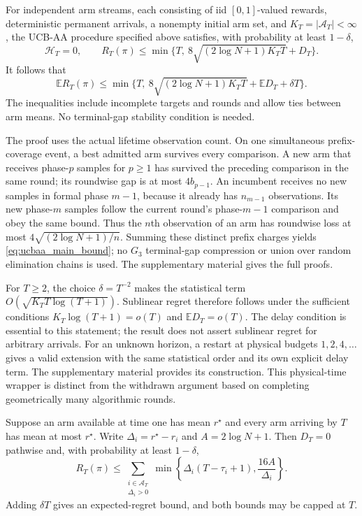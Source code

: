 \begin{theorem}
\label{thm:ucbaa_main_fixed_budget}
For independent arm streams, each consisting of iid $[0,1]$-valued rewards,
deterministic permanent arrivals, a nonempty initial arm set, and
$K_T=|\mathcal A_T|<\infty$,
the UCB-AA procedure specified
above satisfies, with probability at least $1-\delta$,
\[
 \mathcal H_T=0,\qquad
 R_T(\pi)\le\min\{T,\ 8\sqrt{(2\log N+1)K_TT}+D_T\}.
\]
It follows that
\begin{equation}
 \mathbb E R_T(\pi)\le
 \min\{T,\ 8\sqrt{(2\log N+1)K_TT}
                  +\mathbb E D_T+\delta T\}.
 \label{eq:ucbaa_main_bound}
\end{equation}
The inequalities include incomplete targets and rounds and allow ties
between arm means. No terminal-gap stability condition is needed.
\end{theorem}

The proof uses the actual lifetime observation count. On one simultaneous
prefix-coverage event, a best admitted arm survives every comparison.
A new arm that receives phase-$p$ samples for $p\ge1$ has survived the
preceding comparison in the same round; its roundwise gap is at most
$4b_{p-1}$. An incumbent receives no new samples in formal phase $m-1$,
because it already has $n_{m-1}$ observations. Its new phase-$m$ samples
follow the current round's phase-$m-1$ comparison and obey the same bound.
Thus the $n$th observation of an arm has roundwise loss at most
$4\sqrt{(2\log N+1)/n}$. Summing these distinct prefix charges yields
\eqref{eq:ucbaa_main_bound}; no $G_3$ terminal-gap compression or
union over random elimination chains is used. The supplementary material
gives the full proofs.

For $T\ge2$, the choice $\delta=T^{-2}$ makes the statistical term
$O(\sqrt{K_TT\log(T+1)})$. Sublinear regret therefore follows under
the sufficient conditions $K_T\log(T+1)=o(T)$ and
$\mathbb E D_T=o(T)$. The delay condition is essential to this statement;
the result does not assert sublinear regret for arbitrary arrivals.
For an unknown horizon, a restart at physical budgets $1,2,4,\ldots$
gives a valid extension with the same statistical order and its own explicit
delay term. The supplementary material provides its construction.
This physical-time wrapper is distinct from the withdrawn argument based
on completing geometrically many algorithmic rounds.

\begin{corollary}
\label{cor:ucbaa_main_fixed_gap}
Suppose an arm available at time one has mean $r^\star$ and every arm
arriving by $T$ has mean at most $r^\star$. Write
$\Delta_i=r^\star-r_i$ and $A=2\log N+1$. Then $D_T=0$ pathwise and,
with probability at least $1-\delta$,
\begin{equation}
 R_T(\pi)\le\sum_{\substack{i\in\mathcal A_T\\\Delta_i>0}}
       \min\left\{\Delta_i(T-\tau_i+1),\frac{16A}{\Delta_i}\right\}.
 \label{eq:ucbaa_main_fixed_gap}
\end{equation}
Adding $\delta T$ gives an expected-regret bound, and both bounds may
be capped at $T$.
\end{corollary}

